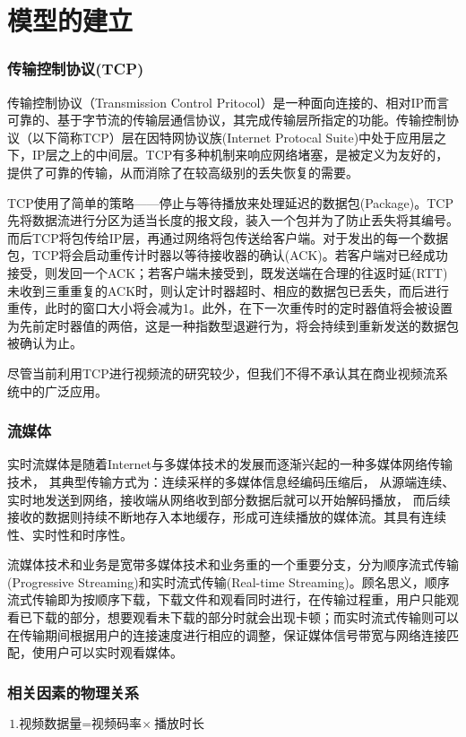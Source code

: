 \documentclass[UTF8]{ctexart}
\begin{document}
\section{模型的建立}

\subsubsection{传输控制协议(TCP)}
传输控制协议（Transmission Control Pritocol）是一种面向连接的、相对IP而言可靠的、基于字节流的传输层通信协议，其完成传输层所指定的功能。传输控制协议（以下简称TCP）层在因特网协议族(Internet Protocal Suite)中处于应用层之下，IP层之上的中间层。TCP有多种机制来响应网络堵塞，是被定义为友好的，提供了可靠的传输，从而消除了在较高级别的丢失恢复的需要。

TCP使用了简单的策略——停止与等待播放来处理延迟的数据包(Package)。TCP先将数据流进行分区为适当长度的报文段，装入一个包并为了防止丢失将其编号。而后TCP将包传给IP层，再通过网络将包传送给客户端。对于发出的每一个数据包，TCP将会启动重传计时器以等待接收器的确认(ACK)。若客户端对已经成功接受，则发回一个ACK；若客户端未接受到，既发送端在合理的往返时延(RTT)未收到三重重复的ACK时，则认定计时器超时、相应的数据包已丢失，而后进行重传，此时的窗口大小将会减为1。此外，在下一次重传时的定时器值将会被设置为先前定时器值的两倍，这是一种指数型退避行为，将会持续到重新发送的数据包被确认为止。

尽管当前利用TCP进行视频流的研究较少，但我们不得不承认其在商业视频流系统中的广泛应用。


\subsubsection{流媒体}
实时流媒体是随着Internet与多媒体技术的发展而逐渐兴起的一种多媒体网络传输技术，
其典型传输方式为：连续采样的多媒体信息经编码压缩后，
从源端连续、实时地发送到网络，接收端从网络收到部分数据后就可以开始解码播放，
而后续接收的数据则持续不断地存入本地缓存，形成可连续播放的媒体流。其具有连续性、实时性和时序性。

流媒体技术和业务是宽带多媒体技术和业务重的一个重要分支，分为顺序流式传输(Progressive Streaming)和实时流式传输(Real-time Streaming)。顾名思义，顺序流式传输即为按顺序下载，下载文件和观看同时进行，在传输过程重，用户只能观看已下载的部分，想要观看未下载的部分时就会出现卡顿；而实时流式传输则可以在传输期间根据用户的连接速度进行相应的调整，保证媒体信号带宽与网络连接匹配，使用户可以实时观看媒体。

\subsubsection{相关因素的物理关系}
$ \text{1.视频数据量=视频码率} \times\ \text{播放时长} $
\end{document}
